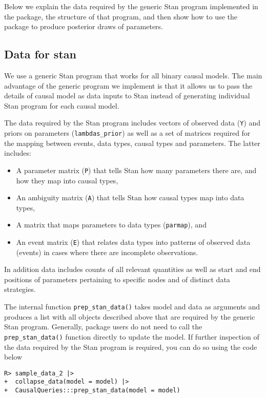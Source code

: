 \documentclass[
  11pt,
  article]{jss}
\providecommand{\tightlist}{%
  \setlength{\itemsep}{0pt}\setlength{\parskip}{0pt}}\usepackage{longtable,booktabs,array}
\begin{document}
Below we explain the data required by the generic Stan program
implemented in the package, the structure of that program, and then show
how to use the package to produce posterior draws of parameters.

\hypertarget{data-for-stan}{%
\subsection{Data for stan}\label{data-for-stan}}

We use a generic Stan program that works for all binary causal models.
The main advantage of the generic program we implement is that it allows
us to pass the details of causal model as data inputs to Stan instead of
generating individual Stan program for each causal model.

The data required by the Stan program includes vectors of observed data
(\texttt{Y}) and priors on parameters (\texttt{lambdas\_prior}) as well
as a set of matrices required for the mapping between events, data
types, causal types and parameters. The latter includes:

\begin{itemize}
\tightlist
\item
  A parameter matrix (\texttt{P}) that tells Stan how many parameters
  there are, and how they map into causal types,
\item
  An ambiguity matrix (\texttt{A}) that tells Stan how causal types map
  into data types,
\item
  A matrix that maps parameters to data types (\texttt{parmap}), and
\item
  An event matrix (\texttt{E}) that relates data types into patterns of
  observed data (events) in cases where there are incomplete
  observations.
\end{itemize}

In addition data includes counts of all relevant quantities as well as
start and end positions of parameters pertaining to specific nodes and
of distinct data strategies.

The internal function \texttt{prep\_stan\_data()} takes model and data
as arguments and produces a list with all objects described above that
are required by the generic Stan program. Generally, package users do
not need to call the \texttt{prep\_stan\_data()} function directly to
update the model. If further inspection of the data required by the Stan
program is required, you can do so using the code below

\begin{verbatim}
R> sample_data_2 |> 
+  collapse_data(model = model) |> 
+  CausalQueries:::prep_stan_data(model = model)
\end{verbatim}
\end{document}
